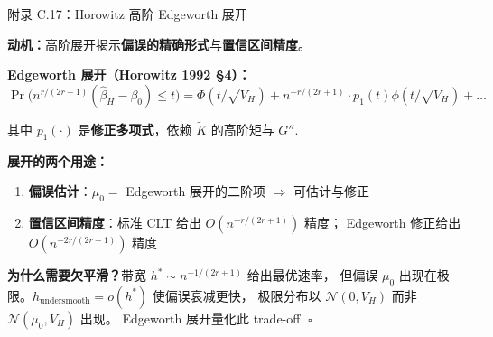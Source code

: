\documentclass[aspectratio=169, 10pt]{beamer}
\begin{document}
\begin{frame}{附录 C.17：Horowitz 高阶 Edgeworth 展开}
  \hypertarget{proof-c17}{}

  \textbf{动机：}高阶展开揭示\textbf{偏误的精确形式}与\textbf{置信区间精度}。

  \textbf{Edgeworth 展开（Horowitz 1992 §4）：}
  $$\Pr\bigl(n^{r/(2r+1)}(\hat\beta_H - \beta_0) \leq t\bigr)
  = \Phi(t/\sqrt{V_H}) + n^{-r/(2r+1)} \cdot p_1(t) \phi(t/\sqrt{V_H}) + \ldots$$

  其中 $p_1(\cdot)$ 是\textbf{修正多项式}，依赖 $\tilde K$ 的高阶矩与 $G''$.

  \begin{highlightbox}
    \textbf{展开的两个用途：}
    \begin{enumerate}\setlength{\itemsep}{1pt}
      \item \textbf{偏误估计}：$\mu_0 = $ Edgeworth 展开的二阶项
      $\Rightarrow$ 可估计与修正
      \item \textbf{置信区间精度}：标准 CLT 给出 $O(n^{-r/(2r+1)})$ 精度；
      Edgeworth 修正给出 $O(n^{-2r/(2r+1)})$ 精度
    \end{enumerate}
  \end{highlightbox}

  \begin{keybox}
    \textbf{为什么需要欠平滑？}带宽 $h^{*} \sim n^{-1/(2r+1)}$ 给出最优速率，
    但偏误 $\mu_0$ 出现在极限。\textbf{$h_{\text{undersmooth}} = o(h^{*})$} 使偏误衰减更快，
    极限分布以 $\mathcal{N}(0, V_H)$ 而非 $\mathcal{N}(\mu_0, V_H)$ 出现。
    Edgeworth 展开量化此 trade-off. $\square$
  \end{keybox}
  \hfill{\scriptsize\hyperlink{main-c17}{}}

\end{frame}
\end{document}
